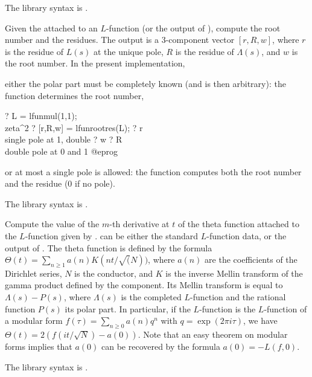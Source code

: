 The library syntax is .

\label{se:lfunrootres}
Given the  attached to an $L$-function (or the output of
), compute the root number and the residues.
The output is a 3-component vector $[r,R,w]$, where $r$ is the
residue of $L(s)$ at the unique pole, $R$ is the residue of $\Lambda(s)$,
and $w$ is the root number. In the present implementation,

\item either the polar part must be completely known (and is then arbitrary):
the function determines the root number,

\bprog
? L = lfunmul(1,1); \\ zeta^2
? [r,R,w] = lfunrootres(L);
? r  \\ single pole at 1, double
? w
? R \\ double pole at 0 and 1
@eprog

\item or at most a single pole is allowed: the function computes both
the root number and the residue ($0$ if no pole).

The library syntax is .

\label{se:lfuntheta}
Compute the value of the $m$-th derivative
at $t$ of the theta function attached to the $L$-function given by .
  can be either the standard $L$-function data, or the output of
.
The theta function is defined by the formula
$\Theta(t)=\sum_{n\ge1}a(n)K(nt/\sqrt(N))$, where $a(n)$ are the coefficients
of the Dirichlet series, $N$ is the conductor, and $K$ is the inverse Mellin
transform of the gamma product defined by the  component.
Its Mellin transform is equal to $\Lambda(s)-P(s)$, where $\Lambda(s)$
is the completed $L$-function and the rational function $P(s)$ its polar part.
In particular, if the $L$-function is the $L$-function of a modular form
$f(\tau)=\sum_{n\ge0}a(n)q^n$ with $q=\exp(2\pi i\tau)$, we have
$\Theta(t)=2(f(it/\sqrt{N})-a(0))$. Note that an easy theorem on modular
forms implies that $a(0)$ can be recovered by the formula $a(0)=-L(f,0)$.

The library syntax is .

